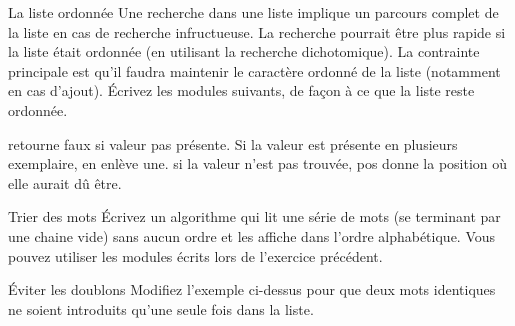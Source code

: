 	
\begin{Exercice}{La liste ordonnée}
		Une recherche dans une liste implique un parcours complet de la liste en
		cas de recherche infructueuse. La recherche pourrait être plus rapide
		si la liste était ordonnée (en utilisant la recherche dichotomique). La
		contrainte principale est qu'il faudra maintenir le
		caractère ordonné de la liste (notamment en cas
		d'ajout). Écrivez les modules suivants, de façon à ce
		que la liste reste ordonnée.

		\begin{Pseudocode}
			\LComment retourne faux si valeur pas présente. 
			\LComment Si la valeur est présente en plusieurs exemplaire, en enlève une.
			\LComment si la valeur n'est pas trouvée, pos donne la position où elle aurait dû être.
		\end{Pseudocode}

\end{Exercice}

\begin{Exercice}{Trier des mots}
		Écrivez un algorithme qui lit une série de mots (se terminant par une
		chaine vide) sans aucun ordre et les affiche dans l’ordre alphabétique.
		Vous pouvez utiliser les modules écrits lors de
		l'exercice précédent.
		
\end{Exercice}

\begin{Exercice}{Éviter les doublons}
		Modifiez l’exemple ci-dessus pour que deux mots identiques ne soient
		introduits qu’une seule fois dans la liste.
\end{Exercice}

